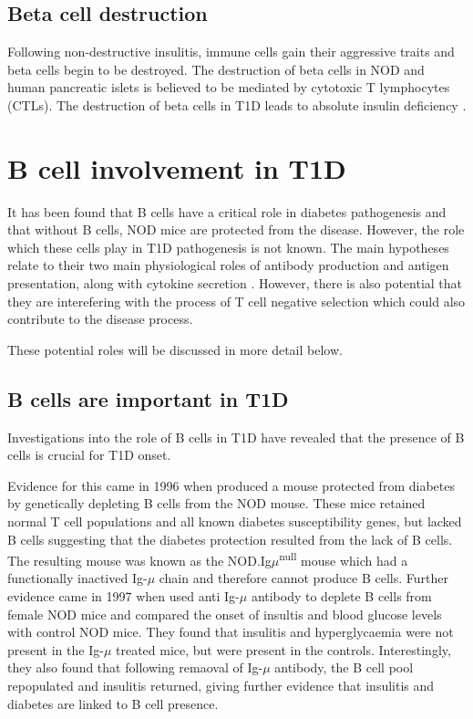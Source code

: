 \subsection{Beta cell destruction}

Following non-destructive insulitis, immune cells gain their aggressive traits and beta cells begin to be destroyed.
The destruction of beta cells in NOD and human pancreatic islets is believed to be mediated by cytotoxic T lymphocytes (CTLs)\citep{Thomas2000, Brodie2008, Hanafusa2008}.
The destruction of beta cells in T1D leads to absolute insulin deficiency \citep{Daneman2006}.


\section{B cell involvement in T1D}
\label{sec:BcellsinT1D}

It has been found that B cells have a critical role in diabetes pathogenesis and that without B cells, NOD mice are protected from the disease.
However, the role which these cells play in T1D pathogenesis is not known.
The main hypotheses relate to their two main physiological roles of antibody production and antigen presentation, along with cytokine secretion \citep{Hinman2014}.
However, there is also potential that they are interefering with the process of T cell negative selection which could also contribute to the disease process.

These potential roles will be discussed in more detail below.

\subsection{B cells are important in T1D}

Investigations into the role of B cells in T1D have revealed that the presence of B cells is crucial for T1D onset.

Evidence for this came in 1996 when \citet{Serreze1996} produced a mouse protected from diabetes by genetically depleting B cells from the NOD mouse.
These mice retained normal T cell populations and all known diabetes susceptibility genes, but lacked B cells suggesting that the diabetes protection resulted from the lack of B cells.
The resulting mouse was known as the NOD.Ig$\mu$\textsuperscript{null} mouse which had a functionally inactived Ig-$\mu$ chain and therefore cannot produce B cells.
Further evidence came in 1997 when \citet{Noorchasm1997} used anti Ig-$\mu$ antibody to deplete B cells from female NOD mice and compared the onset of insultis and blood glucose levels with control NOD mice.
They found that insulitis and hyperglycaemia were not present in the Ig-$\mu$ treated mice, but were present in the controls.
Interestingly, they also found that following remaoval of Ig-$\mu$ antibody, the B cell pool repopulated and insulitis returned, giving further evidence that insulitis and diabetes are linked to B cell presence.



